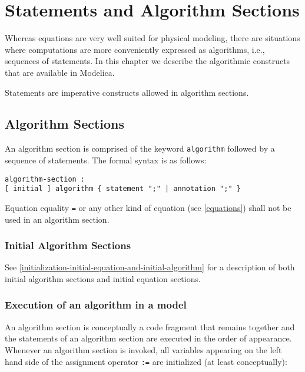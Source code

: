 \chapter{Statements and Algorithm Sections}

Whereas equations are very well suited for physical modeling, there are
situations where computations are more conveniently expressed as
algorithms, i.e., sequences of statements. In this chapter we describe
the algorithmic constructs that are available in Modelica.

Statements are imperative constructs allowed in algorithm sections.

\section{Algorithm Sections}

An algorithm section is comprised of the keyword \lstinline!algorithm! followed by a
sequence of statements. The formal syntax is as follows:

\begin{lstlisting}[language=grammar]
algorithm-section :
[ initial ] algorithm { statement ";" | annotation ";" }
\end{lstlisting}

Equation equality \lstinline!=! or any other kind of equation (see \autoref{equations}) shall
not be used in an algorithm section.

\subsection{Initial Algorithm Sections}

See \autoref{initialization-initial-equation-and-initial-algorithm} for a description of both initial algorithm sections and
initial equation sections.

\subsection{Execution of an algorithm in a model}

An algorithm section is conceptually a code fragment that remains
together and the statements of an algorithm section are executed in the
order of appearance. Whenever an algorithm section is invoked, all
variables appearing on the left hand side of the assignment operator
\lstinline!:=! are initialized (at least conceptually):

